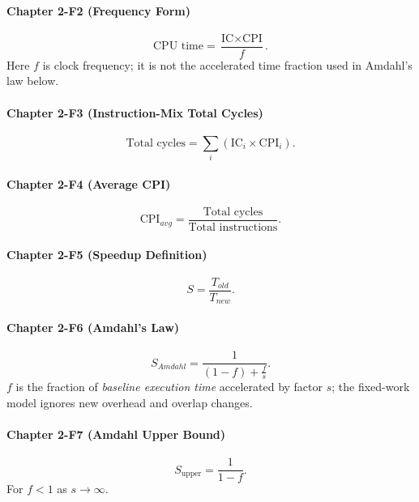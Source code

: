 \paragraph{Chapter 2-F2 (Frequency Form)}\label{par:auto-045}
\begin{equation}\label{eq:auto-056}
    \text{CPU time}=\frac{\text{IC}\times\text{CPI}}{f}.
\end{equation}
Here $f$ is clock frequency; it is not the accelerated time fraction used in Amdahl's law below.

\paragraph{Chapter 2-F3 (Instruction-Mix Total Cycles)}\label{par:auto-046}
\begin{equation}\label{eq:auto-057}
    \text{Total cycles}=\sum_i\left(\text{IC}_i\times\text{CPI}_i\right).
\end{equation}

\paragraph{Chapter 2-F4 (Average CPI)}\label{par:auto-047}
\begin{equation}\label{eq:auto-058}
    \text{CPI}_{avg}=\frac{\text{Total cycles}}{\text{Total instructions}}.
\end{equation}

\paragraph{Chapter 2-F5 (Speedup Definition)}\label{par:auto-048}
\begin{equation}\label{eq:auto-059}
    S=\frac{T_{old}}{T_{new}}.
\end{equation}

\paragraph{Chapter 2-F6 (Amdahl's Law)}\label{par:auto-049}
\begin{equation}\label{eq:auto-060}
    S_{Amdahl}=\frac{1}{(1-f)+\frac{f}{s}}.
\end{equation}
$f$ is the fraction of \emph{baseline execution time} accelerated by factor $s$; the fixed-work model ignores new overhead and overlap changes.

\paragraph{Chapter 2-F7 (Amdahl Upper Bound)}\label{par:auto-050}
\begin{equation}\label{eq:auto-061}
    S_{\text{upper}}=\frac{1}{1-f}.
\end{equation}
For $f<1$ as $s\rightarrow\infty$.

